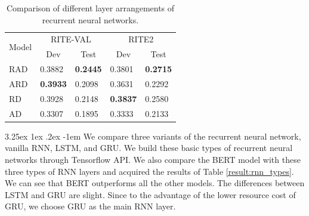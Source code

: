 \documentclass[12pt]{article}
\makeatletter
\renewcommand\paragraph{\@startsection{paragraph}{5}{\z@}%
  {3.25ex \@plus1ex \@minus.2ex}%
  {-1em}%
  {\normalfont\normalsize\bfseries}}
\makeatother
\begin{document}
\begin{CJK*}{UTF8}{bkai}
\begin{spacing}{1.77}
\begin{table}[H]
  \centering
  \setlength{\extrarowheight}{-3pt}
  \begin{tabular}{|l|l|l|l|l|}
  \hline
  \multicolumn{1}{|c|}{\multirow{2}{*}{Model}} & \multicolumn{2}{c|}{RITE-VAL} & \multicolumn{2}{c|}{RITE2} \\ \cline{2-5}
  \multicolumn{1}{|c|}{} & \multicolumn{1}{c|}{Dev} & \multicolumn{1}{c|}{Test} & \multicolumn{1}{c|}{Dev} & \multicolumn{1}{c|}{Test} \\ \hline
  RAD & 0.3882 & \textbf{0.2445} & 0.3801 & \textbf{0.2715} \\ \hline
  ARD & \textbf{0.3933} & 0.2098 & 0.3631 & 0.2292 \\ \hline
  RD & 0.3928 & 0.2148 & \textbf{0.3837} & 0.2580 \\ \hline
  AD & 0.3307 & 0.1895 & 0.3333 & 0.2133 \\ \hline
  \end{tabular}
  \caption{Comparison of different layer arrangements of recurrent neural networks.}
  \label{result:nn_types_comparison}
\end{table}

\paragraph{}
We compare three variants of the recurrent neural network, vanilla RNN, LSTM, and GRU. We build these basic types of recurrent neural networks through Tensorflow API. We also compare the BERT model with these three types of RNN layers and acquired the results of Table \ref{result:rnn_types}. We can see that BERT outperforms all the other models. The differences between LSTM and GRU are slight. Since to the advantage of the lower resource cost of GRU, we choose GRU as the main RNN layer.


\end{spacing}
\end{CJK*}
\end{document}
